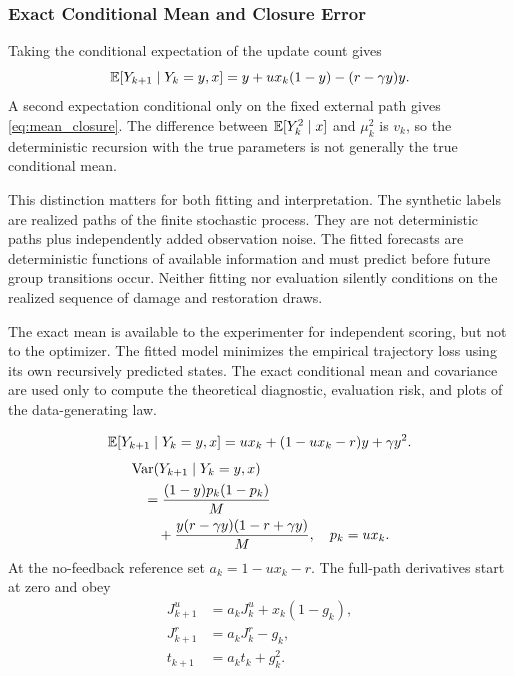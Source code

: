 \subsubsection{Exact Conditional Mean and Closure Error}
Taking the conditional expectation of the update count gives
\[
 \mathbb E[Y_{k+1}\mid Y_k=y,x]
 =y+ux_k(1-y)-(r-\gamma y)y.
\]
A second expectation conditional only on the fixed external path gives \eqref{eq:mean_closure}. The difference between $\mathbb E[Y_k^2\mid x]$ and $\mu_k^2$ is $v_k$, so the deterministic recursion with the true parameters is not generally the true conditional mean.

This distinction matters for both fitting and interpretation. The synthetic labels are realized paths of the finite stochastic process. They are not deterministic paths plus independently added observation noise. The fitted forecasts are deterministic functions of available information and must predict before future group transitions occur. Neither fitting nor evaluation silently conditions on the realized sequence of damage and restoration draws.

The exact mean is available to the experimenter for independent scoring, but not to the optimizer. The fitted model minimizes the empirical trajectory loss using its own recursively predicted states. The exact conditional mean and covariance are used only to compute the theoretical diagnostic, evaluation risk, and plots of the data-generating law.

\begin{equation}
 \mathbb E[Y_{k+1}\mid Y_k=y,x]
 =ux_k+(1-ux_k-r)y+\gamma y^2.
 \label{eq:conditional_transition}
\end{equation}
\begin{equation}
 \begin{split}
 &\operatorname{Var}(Y_{k+1}\mid Y_k=y,x)\\
 &\quad=\frac{(1-y)p_k(1-p_k)}{M}\\
 &\qquad+\frac{y(r-\gamma y)(1-r+\gamma y)}{M},\quad p_k=ux_k.
 \end{split}
 \label{eq:innovation_variance}
\end{equation}
At the no-feedback reference set $a_k=1-ux_k-r$. The full-path derivatives start at zero and obey
\begin{equation}
 \begin{aligned}
 J^u_{k+1}&=a_kJ^u_k+x_k(1-g_k),\\
 J^r_{k+1}&=a_kJ^r_k-g_k,\\
 t_{k+1}&=a_kt_k+g_k^2.
 \end{aligned}
 \label{eq:sensitivity}
\end{equation}

